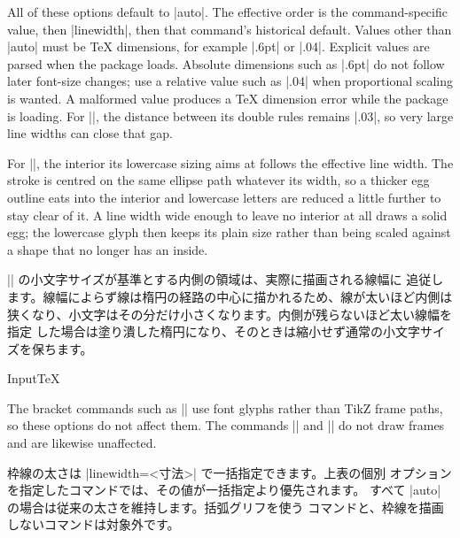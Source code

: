\documentclass[luatex,fontsize=8pt,paper=b5,twoside]{jlreq}%
\begin{document}
\begin{description}
  All of these options default to \KKverb|auto|. The effective order is the
  command-specific value, then \KKverb|linewidth|, then that command's
  historical default. Values other than \KKverb|auto| must be TeX dimensions,
  for example \KKverb|.6pt| or \KKverb|.04\zw|.
  Explicit values are parsed when the package loads. Absolute dimensions such
  as \KKverb|.6pt| do not follow later font-size changes; use a relative value
  such as \KKverb|.04\zw| when proportional scaling is wanted. A malformed
  value produces a TeX dimension error while the package is loading. For
  \KKverb|\nmaru|, the distance between its double rules remains
  \KKverb|.03\zw|, so very large line widths can close that gap.

  For \KKverb|\jegg|, the interior its lowercase sizing aims at follows the
  effective line width. The stroke is centred on the same ellipse path
  whatever its width, so a thicker egg outline eats into the interior and
  lowercase letters are reduced a little further to stay clear of it. A line
  width wide enough to leave no interior at all draws a solid egg; the
  lowercase glyph then keeps its plain size rather than being scaled against a
  shape that no longer has an inside.

  \KKverb|\jegg| の小文字サイズが基準とする内側の領域は、実際に描画される線幅に
  追従します。線幅によらず線は楕円の経路の中心に描かれるため、線が太いほど内側は
  狭くなり、小文字はその分だけ小さくなります。内側が残らないほど太い線幅を指定
  した場合は塗り潰した楕円になり、そのときは縮小せず通常の小文字サイズを保ちます。

  \begin{SourceCode}{Input}{TeX}
    \usepackage[
      linewidth=.6pt,
      marulinewidth=.3pt,
      hishilinewidth=1pt
    ]{KKsymbols}
  \end{SourceCode}

  The bracket commands such as \KKverb|\kakko| use font glyphs rather than
  TikZ frame paths, so these options do not affect them. The commands
  \KKverb|\ichimoji| and \KKverb|\zenkakuhabafixer| do not draw frames and are
  likewise unaffected.

  枠線の太さは \KKverb|linewidth=<寸法>| で一括指定できます。上表の個別
  オプションを指定したコマンドでは、その値が一括指定より優先されます。
  すべて \KKverb|auto| の場合は従来の太さを維持します。括弧グリフを使う
  コマンドと、枠線を描画しないコマンドは対象外です。


\end{description}
\end{document}

